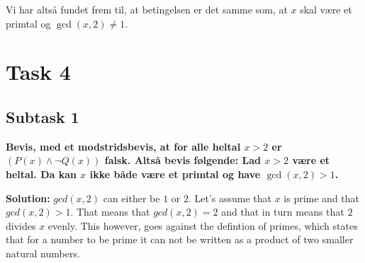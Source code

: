 Vi har altså fundet frem til, at betingelsen er det samme som, at $x$ skal være et primtal og $\gcd(x,2)\neq 1$.

\section{Task 4}
\subsection{Subtask 1}
\noindent
\textbf{Bevis, med et modstridsbevis, at for alle heltal $x>2$ er $(P(x) \wedge \neg Q(x))$ falsk. Altså bevis følgende: Lad $x>2$ være et heltal. Da kan $x$ ikke både være et primtal og have $\gcd(x,2) > 1$. }

\bigskip
\noindent
\textbf{Solution:} $gcd(x,2)$ can either be $1$ or $2$. Let's assume that $x$ is prime and that $gcd(x,2)>1$. That means that $gcd(x,2)=2$ and that in turn means that $2$ divides $x$ evenly. This however, goes against the defintion of primes, which states that for a number to be prime it can not be written as a product of two smaller natural numbers. 

